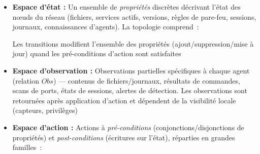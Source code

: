 \begin{itemize}
  \item \textbf{Espace d'état :} Un ensemble de \emph{propriétés} discrètes décrivant l'état des nœuds du réseau (fichiers, services actifs, versions, règles de pare-feu, sessions, journaux, connaissances d'agents). La topologie comprend~:
        Les transitions modifient l'ensemble des propriétés (ajout/suppression/mise à jour) quand les pré-conditions d'action sont satisfaites
  \item \textbf{Espace d'observation :} Observations partielles spécifiques à chaque agent (relation $Obs$) — contenus de fichiers/journaux, résultats de commandes, scans de ports, états de sessions, alertes de détection. Les observations sont retournées après application d'action et dépendent de la visibilité locale (capteurs, privilèges)
  \item \textbf{Espace d'action :} Actions à \emph{pré-conditions} (conjonctions/disjonctions de propriétés) et \emph{post-conditions} (écritures sur l'état), réparties en grandes familles~:
\end{itemize}
